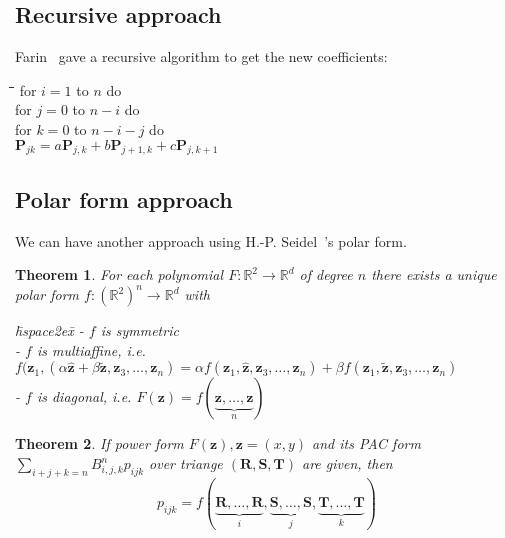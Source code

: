 \documentclass[reqno]{amsart}
\newtheorem{theorem}{Theorem}
\theoremstyle{plain}
\begin{document}
\subsection{Recursive approach}
Farin~\cite{h2} gave a recursive algorithm to get the new coefficients:
\begin{tabbing}
  \hspace*{.25in}\=\hspace{2ex}\=\hspace{2ex}\=\hspace{2ex}\=\hspace{2ex}\kill
    \>for $i=1$ to $n$ do \\
    \> \>for $j=0$ to $n-i$ do \\
    \> \> \>for $k=0$ to $n-i-j$ do \\
    \> \> \> \>$\mathbf{P}_{jk} = a\mathbf{P}_{j,k} + b\mathbf{P}_{j+1,k} + c\mathbf{P}_{j,k+1} $
\end{tabbing}

\subsection{Polar form approach}
We can have another approach using H.-P. Seidel~\cite{h3}'s polar form. 
\begin{theorem}\label{T:f1}\cite{h3} For each polynomial $F:\mathbb{R}^{2}\rightarrow
\mathbb{R}^{d}$ of degree $n$ there exists a unique polar form
$f:(\mathbb{R}^{2})^{n} \rightarrow \mathbb{R}^{d}$ with
\begin{tabbing}
 \hspace*{.25in}\=hspace{2ex}\=\hspace{2ex}\kill
\> - $f$ is symmetric  \\
\> - $f$ is multiaffine, i.e. \\
\> \> $f(\mathbf{z}_{1},(\alpha\hat{\mathbf{z}} + \beta\tilde{\mathbf{z}},\mathbf{z}_{3},\ldots,\mathbf{z}_{n}) = \alpha f(\mathbf{z}_{1},\hat{\mathbf{z}},\mathbf{z}_{3},\ldots,\mathbf{z}_{n}) + \beta f(\mathbf{z}_{1},\tilde{\mathbf{z}} ,\mathbf{z}_{3},\ldots,\mathbf{z}_{n}) $ \\
\> - $f$ is diagonal, i.e. $F(\mathbf{z}) = f(\underbrace{\mathbf{z},\ldots,\mathbf{z}}_{n}) $
\end{tabbing}
\end{theorem}

\begin{theorem}\label{T:f2}\cite{h3}
If power form $F(\mathbf{z}),\mathbf{z}=(x,y)$ and its PAC form $\sum_{i+j+k=n}B^{n}_{i,j,k}p_{ijk}$ over triange $(\mathbf{R},\mathbf{S},\mathbf{T})$ are given, then
\[
   p_{ijk}= f(\underbrace{\mathbf{R},\ldots,\mathbf{R}}_{i},\underbrace{\mathbf{S},\ldots,\mathbf{S}}_{j},\underbrace{\mathbf{T},\ldots,\mathbf{T}}_{k})
\]
\end{theorem}
\end{document}
